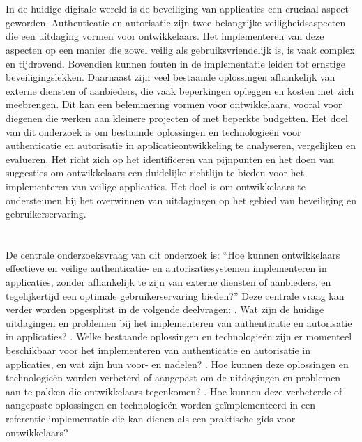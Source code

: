 \section{}%
\label{sec:probleemstelling}
In de huidige digitale wereld is de beveiliging van applicaties een cruciaal aspect geworden. Authenticatie en autorisatie zijn twee belangrijke veiligheidsaspecten die een uitdaging vormen voor ontwikkelaars. 
Het implementeren van deze aspecten op een manier die zowel veilig als gebruiksvriendelijk is, is vaak complex en tijdrovend. Bovendien kunnen fouten in de implementatie leiden tot ernstige beveiligingslekken. 
\newline
Daarnaast zijn veel bestaande oplossingen afhankelijk van externe diensten of aanbieders, die vaak beperkingen opleggen en kosten met zich meebrengen. Dit kan een belemmering vormen voor ontwikkelaars, 
vooral voor diegenen die werken aan kleinere projecten of met beperkte budgetten.
\newline
Het doel van dit onderzoek is om bestaande oplossingen en technologieën voor authenticatie en autorisatie in applicatieontwikkeling te analyseren, vergelijken en evalueren. 
Het richt zich op het identificeren van pijnpunten en het doen van suggesties om ontwikkelaars een duidelijke richtlijn te bieden voor het implementeren van veilige applicaties. 
Het doel is om ontwikkelaars te ondersteunen bij het overwinnen van uitdagingen op het gebied van beveiliging en gebruikerservaring.

\section{}%
\label{sec:onderzoeksvraag}

De centrale onderzoeksvraag van dit onderzoek is: ``Hoe kunnen ontwikkelaars effectieve en veilige authenticatie- en autorisatiesystemen implementeren in applicaties, zonder afhankelijk te zijn van 
externe diensten of aanbieders, en tegelijkertijd een optimale gebruikerservaring bieden?''
\newline
\newline
Deze centrale vraag kan verder worden opgesplitst in de volgende deelvragen:
\newline
{}. Wat zijn de huidige uitdagingen en problemen bij het implementeren van authenticatie en autorisatie in applicaties?
. Welke bestaande oplossingen en technologieën zijn er momenteel beschikbaar voor het implementeren van authenticatie en autorisatie in applicaties, en wat zijn hun voor- en nadelen?
. Hoe kunnen deze oplossingen en technologieën worden verbeterd of aangepast om de uitdagingen en problemen aan te pakken die ontwikkelaars tegenkomen?
. Hoe kunnen deze verbeterde of aangepaste oplossingen en technologieën worden geïmplementeerd in een referentie-implementatie die kan dienen als een praktische gids voor ontwikkelaars?

